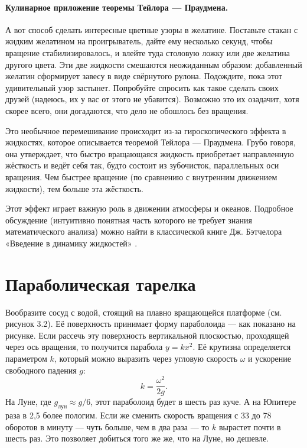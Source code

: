 \paragraph{Кулинарное приложение теоремы Тейлора --- Праудмена.}
А вот способ сделать интересные цветные узоры в желатине.
Поставьте стакан с жидким желатином на проигрыватель, дайте ему несколько секунд, чтобы вращение стабилизировалось, и влейте туда столовую ложку или две желатина другого цвета.
Эти две жидкости смешаются неожиданным образом: добавленный желатин сформирует завесу в виде свёрнутого рулона.
Подождите, пока этот удивительный узор застынет.
Попробуйте спросить как такое сделать своих друзей (надеюсь, их у вас от этого не убавится).
Возможно это их озадачит, хотя скорее всего, они догадаются, что дело не обошлось без вращения.

Это необычное перемешивание происходит из-за гироскопического эффекта в жидкостях, которое описывается теоремой Тейлора --- Праудмена.
Грубо говоря, она утверждает, что быстро вращающаяся жидкость приобретает направленную жёсткость и ведёт себя так, будто состоит из зубочисток, параллельных оси вращения.
Чем быстрее вращение (по сравнению с внутренним движением жидкости), тем больше эта жёсткость.

Этот эффект играет важную роль в движении атмосферы и океанов.
Подробное обсуждение (интуитивно понятная часть которого не требует знания математического анализа) можно найти в классической книге Дж. Бэтчелора «Введение в динамику жидкостей» \cite{batchelor1967}.

\section{Параболическая тарелка}

Вообразите сосуд с водой, стоящий на плавно вращающейся платформе (см. рисунок 3.2).
Её поверхность принимает форму параболоида — как показано на рисунке.
Если рассечь эту поверхность вертикальной плоскостью, проходящей через ось вращения, то получится парабола $y = kx^2$.
Её крутизна определяется параметром $k$, который можно выразить через угловую скорость $\omega$ и ускорение свободного падения $g$:
\begin{equation}
k = \frac{\omega^2}{2g}.
\label{eq:3.1}
\end{equation}
На Луне, где $g_{\text{лун}} \approx g/6$, этот параболоид будет в шесть раз куче.
А на Юпитере раза в 2{,}5 более пологим.
Если же сменить скорость вращения с 33 до 78 оборотов в минуту — чуть больше, чем в два раза — то $k$ вырастет почти в шесть раз.
Это позволяет добиться того же же, что на Луне, но дешевле.

